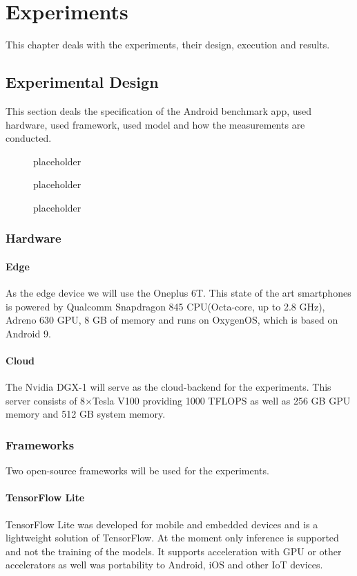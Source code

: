 \chapter{Experiments}
This chapter deals with the experiments, their design, execution and results.
\section{Experimental Design}
This section deals the specification of the Android benchmark app, used hardware, used framework, used model and how the measurements are conducted. 
\begin{figure}[H]
\centering

\caption{placeholder}
\label{fig:cloud}
\end{figure}
\begin{figure}[H]
\centering

\caption{placeholder}
\label{fig:cloud}
\end{figure}
\begin{figure}[H]
\centering

\caption{placeholder}
\label{fig:edge}
\end{figure}
\subsection{Hardware}
\subsubsection{Edge}
As the edge device we will use the Oneplus 6T. This state of the art smartphones is powered by Qualcomm Snapdragon 845 CPU(Octa-core, up to 2.8 GHz), Adreno 630 GPU, 8 GB of memory and runs on OxygenOS, which is based on Android 9.
\subsubsection{Cloud}
The Nvidia DGX-1 will serve as the cloud-backend for the experiments. This server consists of 8$\times$Tesla V100 providing 1000 TFLOPS as well as 256 GB GPU memory and 512 GB system memory.
\subsection{Frameworks}
Two open-source frameworks will be used for the experiments.
\subsubsection{TensorFlow Lite}
TensorFlow Lite was developed for mobile and embedded devices and is a lightweight solution of TensorFlow.
At the moment only inference is supported and not the training of the models.
It supports acceleration with GPU or other accelerators as well was portability to Android, iOS and other IoT devices.


